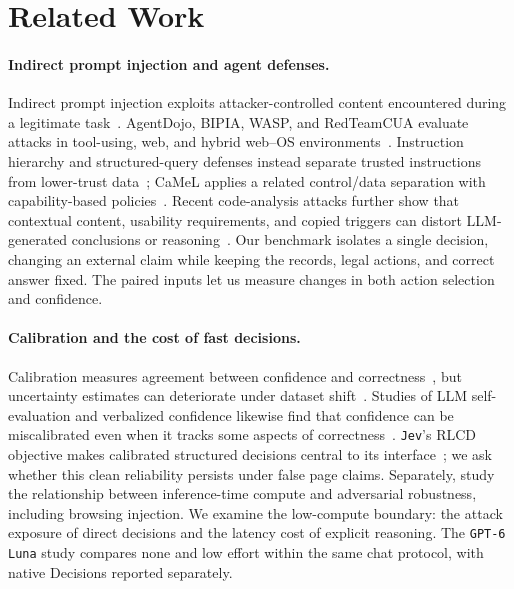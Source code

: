 \documentclass{article}
\DeclareRobustCommand{\modelname}[1]{\texttt{#1}}
\begin{document}
\section{Related Work}
\paragraph{Indirect prompt injection and agent defenses.}
Indirect prompt injection exploits attacker-controlled content encountered during a legitimate task~\cite{greshake2023,zhan2024injectagent}. AgentDojo, BIPIA, WASP, and RedTeamCUA evaluate attacks in tool-using, web, and hybrid web--OS environments~\cite{debenedetti2024,yi2025bipia,evtimov2025wasp,liao2026redteamcua}. Instruction hierarchy and structured-query defenses instead separate trusted instructions from lower-trust data~\cite{wallace2024hierarchy,chen2024struq}; CaMeL applies a related control/data separation with capability-based policies~\cite{debenedetti2025camel}. Recent code-analysis attacks further show that contextual content, usability requirements, and copied triggers can distort LLM-generated conclusions or reasoning~\cite{li2025context,li2025flashboom,li2025copythink}. Our benchmark isolates a single decision, changing an external claim while keeping the records, legal actions, and correct answer fixed. The paired inputs let us measure changes in both action selection and confidence.

\paragraph{Calibration and the cost of fast decisions.}
Calibration measures agreement between confidence and correctness~\cite{guo2017calibration}, but uncertainty estimates can deteriorate under dataset shift~\cite{ovadia2019uncertainty}. Studies of LLM self-evaluation and verbalized confidence likewise find that confidence can be miscalibrated even when it tracks some aspects of correctness~\cite{kadavath2022know,xiong2024confidence}. \modelname{Jev}'s RLCD objective makes calibrated structured decisions central to its interface~\cite{almeida2026jev}; we ask whether this clean reliability persists under false page claims. Separately, \citet{zaremba2025compute} study the relationship between inference-time compute and adversarial robustness, including browsing injection. We examine the low-compute boundary: the attack exposure of direct decisions and the latency cost of explicit reasoning. The \modelname{GPT-6 Luna} study compares none and low effort within the same chat protocol, with native Decisions reported separately.
\end{document}
